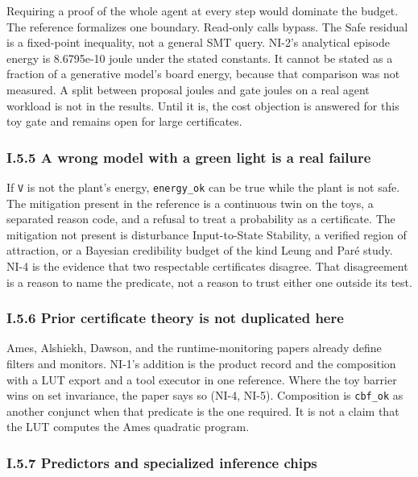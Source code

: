 \documentclass[
  10pt,
]{article}
\begin{document}
Requiring a proof of the whole agent at every step would dominate the
budget. The reference formalizes one boundary. Read-only calls bypass.
The Safe residual is a fixed-point inequality, not a general SMT query.
NI-2's analytical episode energy is 8.6795e-10 joule under the stated
constants. It cannot be stated as a fraction of a generative model's
board energy, because that comparison was not measured. A split between
proposal joules and gate joules on a real agent workload is not in the
results. Until it is, the cost objection is answered for this toy gate
and remains open for large certificates.

\subsubsection{I.5.5 A wrong model with a green light is a real
failure}\label{i.5.5-a-wrong-model-with-a-green-light-is-a-real-failure}

If \texttt{V} is not the plant's energy, \texttt{energy\_ok} can be true
while the plant is not safe. The mitigation present in the reference is
a continuous twin on the toys, a separated reason code, and a refusal to
treat a probability as a certificate. The mitigation not present is
disturbance Input-to-State Stability, a verified region of attraction,
or a Bayesian credibility budget of the kind Leung and Paré study. NI-4
is the evidence that two respectable certificates disagree. That
disagreement is a reason to name the predicate, not a reason to trust
either one outside its test.

\subsubsection{I.5.6 Prior certificate theory is not duplicated
here}\label{i.5.6-prior-certificate-theory-is-not-duplicated-here}

Ames, Alshiekh, Dawson, and the runtime-monitoring papers already define
filters and monitors. NI-1's addition is the product record and the
composition with a LUT export and a tool executor in one reference.
Where the toy barrier wins on set invariance, the paper says so (NI-4,
NI-5). Composition is \texttt{cbf\_ok} as another conjunct when that
predicate is the one required. It is not a claim that the LUT computes
the Ames quadratic program.

\subsubsection{I.5.7 Predictors and specialized inference
chips}\label{i.5.7-predictors-and-specialized-inference-chips}
\end{document}
